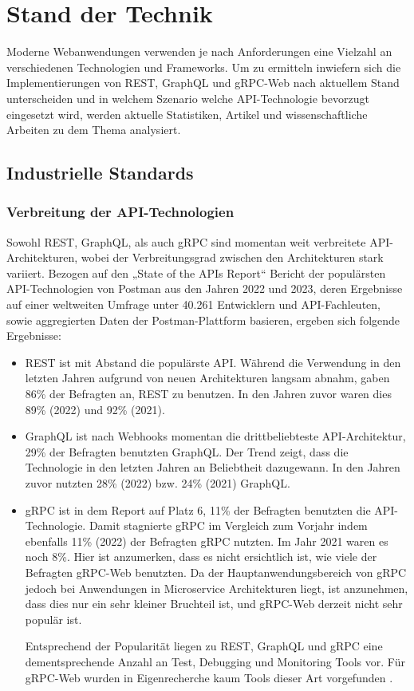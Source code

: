 \chapter{Stand der Technik}
\label{chap:intro}

Moderne Webanwendungen verwenden je nach Anforderungen eine Vielzahl an verschiedenen Technologien und Frameworks. Um zu ermitteln inwiefern sich die Implementierungen von REST, GraphQL und gRPC-Web nach aktuellem Stand unterscheiden und in welchem Szenario welche API-Technologie bevorzugt eingesetzt wird, werden aktuelle Statistiken, Artikel und wissenschaftliche Arbeiten zu dem Thema analysiert.

\chapterstart
\section{Industrielle Standards}
\subsection{Verbreitung der API-Technologien}
Sowohl REST, GraphQL, als auch gRPC sind momentan weit verbreitete API-Architekturen, wobei der Verbreitungsgrad zwischen den Architekturen stark variiert. Bezogen auf den „State of the APIs Report“ Bericht der populärsten API-Technologien von Postman aus den Jahren 2022 und 2023, deren Ergebnisse auf einer weltweiten Umfrage unter 40.261 Entwicklern und API-Fachleuten, sowie aggregierten Daten der Postman-Plattform basieren, ergeben sich folgende Ergebnisse:

\begin{itemize}
	\item REST ist mit Abstand die populärste API. Während die Verwendung in den letzten Jahren aufgrund von neuen Architekturen langsam abnahm, gaben 86\% der Befragten an, REST zu benutzen. In den Jahren zuvor waren dies 89\% (2022) und 92\% (2021).
	\item GraphQL ist nach Webhooks momentan die drittbeliebteste API-Architektur, 29\% der Befragten benutzten GraphQL. Der Trend zeigt, dass die Technologie in den letzten Jahren an Beliebtheit dazugewann. In den Jahren zuvor nutzten 28\% (2022) bzw. 24\% (2021) GraphQL.
	\item gRPC ist in dem Report auf Platz 6, 11\% der Befragten benutzten die API-Technologie. Damit stagnierte gRPC im Vergleich zum Vorjahr indem ebenfalls 11\% (2022) der Befragten gRPC nutzten. Im Jahr 2021 waren es noch 8\%. Hier ist anzumerken, dass es nicht ersichtlich ist, wie viele der Befragten gRPC-Web benutzten. Da der Hauptanwendungsbereich von gRPC jedoch bei Anwendungen in Microservice Architekturen liegt, ist anzunehmen, dass dies nur ein sehr kleiner Bruchteil ist, und gRPC-Web derzeit nicht sehr populär ist.
	
	Entsprechend der Popularität liegen zu REST, GraphQL und gRPC eine dementsprechende Anzahl an Test, Debugging und Monitoring Tools vor. Für gRPC-Web wurden in Eigenrecherche kaum Tools dieser Art vorgefunden \parencite{postman2022, postman2023}.
\end{itemize}


